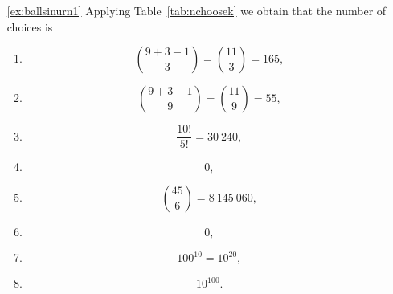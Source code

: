 \begin{enumerate}
\item[\ref{ex:ballsinurn1}]
Applying Table~\ref{tab:nchoosek} we obtain that the number of choices is 
\begin{enumerate}
\item
\[
\binom{9 + 3 -1}{3} = \binom{11}{3} = 165, 
\]

\item
\[
\binom{9 + 3 -1}{9} = \binom{11}{9} = 55, 
\]

\item
\[
\frac{10!}{5!} = 30~240, 
\]

\item
\[0,\]

\item
\[
\binom{45}{6} = 8~145~060, 
\]

\item
\[0,\]

\item
\[
100^{10} = 10^{20}, 
\]

\item
\[10^{100}.\] 
\end{enumerate}
\end{enumerate}


\newpage
